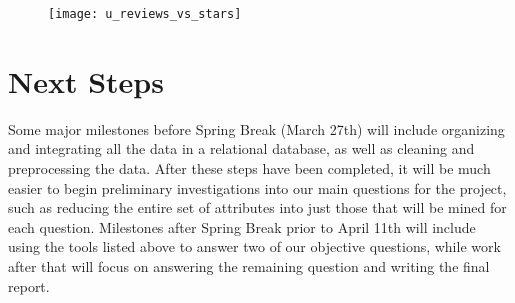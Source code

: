 \begin{figure}
\texttt{[image: u\_reviews\_vs\_stars]}
\end{figure}

\quad
\section{Next Steps}

\quad Some major milestones before Spring Break (March 27th) will include organizing and integrating all the data in a relational database, as well as cleaning and preprocessing the data. After these steps have been completed, it will be much easier to begin preliminary investigations into our main questions for the project, such as reducing the entire set of attributes into just those that will be mined for each question. Milestones after Spring Break prior to April 11th will include using the tools listed above to answer two of our objective questions, while work after that will focus on answering the remaining question and writing the final report.


%




